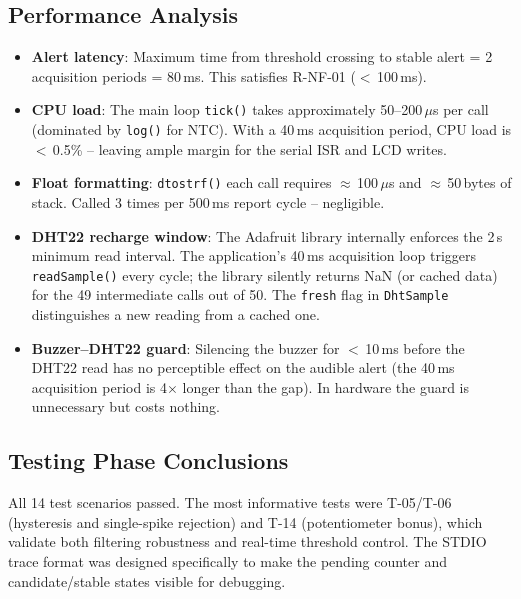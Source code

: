 \documentclass[12pt]{article}
\begin{document}
\subsection{Performance Analysis}

\begin{itemize}
    \item \textbf{Alert latency}: Maximum time from threshold crossing to stable alert = 2 acquisition periods = 80\,ms. This satisfies R-NF-01 ($<$\,100\,ms).
    \item \textbf{CPU load}: The main loop \texttt{tick()} takes approximately 50--200\,$\mu$s per call (dominated by \texttt{log()} for NTC). With a 40\,ms acquisition period, CPU load is $<$\,0.5\% -- leaving ample margin for the serial ISR and LCD writes.
    \item \textbf{Float formatting}: \texttt{dtostrf()} each call requires $\approx$\,100\,$\mu$s and $\approx$\,50\,bytes of stack. Called 3 times per 500\,ms report cycle -- negligible.
    \item \textbf{DHT22 recharge window}: The Adafruit library internally enforces the 2\,s minimum read interval. The application's 40\,ms acquisition loop triggers \texttt{readSample()} every cycle; the library silently returns NaN (or cached data) for the 49 intermediate calls out of 50. The \texttt{fresh} flag in \texttt{DhtSample} distinguishes a new reading from a cached one.
    \item \textbf{Buzzer--DHT22 guard}: Silencing the buzzer for $<$\,10\,ms before the DHT22 read has no perceptible effect on the audible alert (the 40\,ms acquisition period is 4$\times$ longer than the gap). In hardware the guard is unnecessary but costs nothing.
\end{itemize}

\subsection{Testing Phase Conclusions}
\hspace{0.8cm} All 14 test scenarios passed. The most informative tests were T-05/T-06 (hysteresis and single-spike rejection) and T-14 (potentiometer bonus), which validate both filtering robustness and real-time threshold control. The STDIO trace format was designed specifically to make the pending counter and candidate/stable states visible for debugging.

\end{document}
